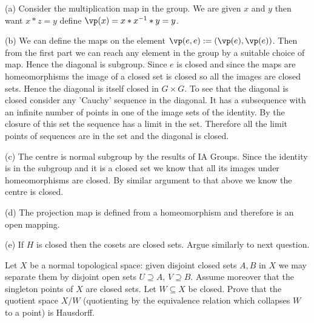 \begin{solution}[\bf Solution.]
\ben
\item [(a)] Consider the multiplication map in the group. We are given $x$ and $y$ then want $x*z = y$ define $\vp(x) = x*x^{-1}*y = y$.

\item [(b)] We can define the maps on the element $\vp(e,e):= (\vp(e),\vp(e))$. Then from the first part we can reach any element in the group by a suitable choice of map. Hence the diagonal is subgroup. Since $e$ is closed and since the maps are homeomorphisms the image of a closed set is closed so all the images are closed sets. Hence the diagonal is itself closed in $G\times G$. To see that the diagonal is closed consider any 'Cauchy' sequence in the diagonal. It has a subsequence with an infinite number of points in one of the image sets of the identity. By the closure of this set the sequence has a limit in the set. Therefore all the limit points of sequences are in the set and the diagonal is closed.

\item [(c)] The centre is normal subgroup by the results of IA Groups. Since the identity is in the subgroup and it is a closed set we know that all its images under homeomorphisms are closed. By similar argument to that above we know the centre is closed.

\item [(d)] The projection map is defined from a homeomorphism and therefore is an open mapping.

\item [(e)] If $H$ is closed then the cosets are closed sets. Argue similarly to next question.
\een
\end{solution}


\begin{problem}
Let $X$ be a normal topological space: given disjoint closed sets $A,B$ in $X$ we may separate them by disjoint open sets $U\supseteq A$, $V\supseteq B$. Assume moreover that the singleton points of $X$ are closed sets. Let $W\subseteq X$ be closed. Prove that the quotient space $X/W$ (quotienting by the equivalence relation which collapses $W$ to a point) is Hausdorff.
\end{problem}

